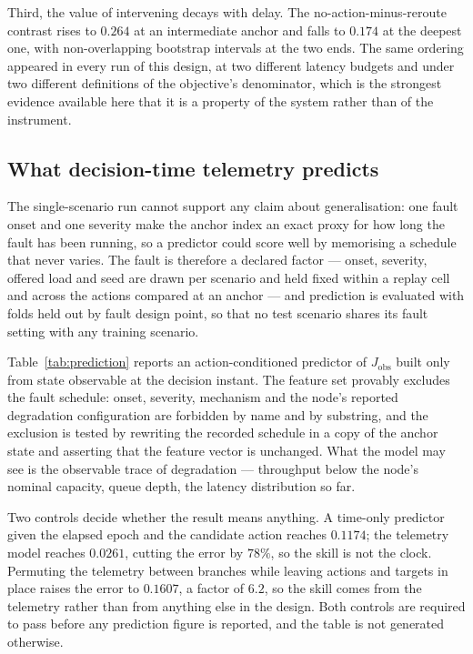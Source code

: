\documentclass[journal]{IEEEtran}
\begin{document}
Third, the value of intervening decays with delay. The no-action-minus-reroute
contrast rises to $0.264$ at an intermediate anchor and falls to $0.174$ at the
deepest one, with non-overlapping bootstrap intervals at the two ends. The same
ordering appeared in every run of this design, at two different latency budgets
and under two different definitions of the objective's denominator, which is the
strongest evidence available here that it is a property of the system rather than
of the instrument.

\subsection{What decision-time telemetry predicts}
\label{sec:results-prediction}




The single-scenario run cannot support any claim about generalisation: one fault
onset and one severity make the anchor index an exact proxy for how long the
fault has been running, so a predictor could score well by memorising a schedule
that never varies. The fault is therefore a declared factor --- onset, severity,
offered load and seed are drawn per scenario and held fixed within a replay cell
and across the actions compared at an anchor --- and prediction is evaluated with
folds held out by fault design point, so that no test scenario shares its fault
setting with any training scenario.

Table~\ref{tab:prediction} reports an action-conditioned predictor of
$J_{\mathrm{obs}}$ built only from state observable at the decision instant. The
feature set provably excludes the fault schedule: onset, severity, mechanism and
the node's reported degradation configuration are forbidden by name and by
substring, and the exclusion is tested by rewriting the recorded schedule in a
copy of the anchor state and asserting that the feature vector is unchanged. What
the model may see is the observable trace of degradation --- throughput below the
node's nominal capacity, queue depth, the latency distribution so far.

Two controls decide whether the result means anything. A time-only predictor
given the elapsed epoch and the candidate action reaches $0.1174$; the telemetry
model reaches $0.0261$, cutting the error by $78\%$, so the skill is not the
clock. Permuting the telemetry between branches while leaving actions and targets
in place raises the error to $0.1607$, a factor of $6.2$, so the skill comes from
the telemetry rather than from anything else in the design. Both controls are
required to pass before any prediction figure is reported, and the table is not
generated otherwise.
\end{document}
